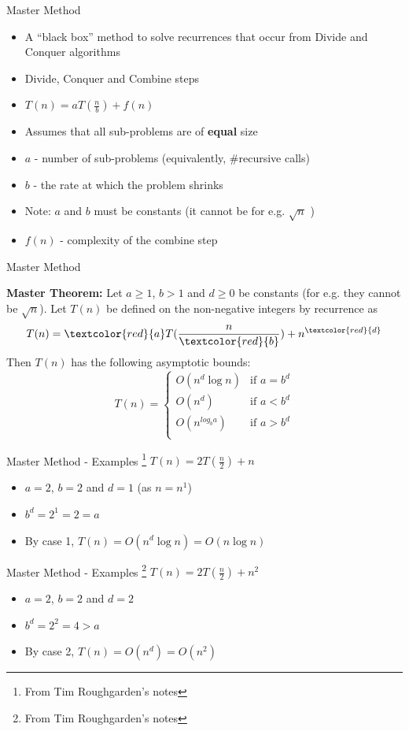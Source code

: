 \documentclass{beamer}
\newcommand{\hred}[1]{{\textcolor{red}{#1}}}
\begin{document}
\begin{frame}{Master Method}
\begin{itemize}
    \item A ``black box'' method to solve recurrences that occur from Divide and Conquer algorithms
    \item Divide, Conquer and Combine steps 
    \item $T(n) = aT(\frac{n}{b}) + f(n)$
    \item Assumes that all sub-problems are of {\bf equal} size
    \item $a$ - number of sub-problems (equivalently, \#recursive calls)
    \item $b$ - the rate at which the problem shrinks
    \item Note: $a$ and $b$ must be constants  (it cannot be for e.g. $\sqrt{n}$ )
    \item $f(n)$ - complexity of the combine step 
\end{itemize}
\end{frame}

\begin{frame}{Master Method}

{\bf Master Theorem:}  Let $a \geq 1$, $b > 1$ and $d \geq 0$ be constants (for e.g. they cannot be $\sqrt{n}$).
Let $T(n)$ be defined on the non-negative integers by recurrence as 
                    $$T(n) = \hred{a} T(\frac{n}{\hred{b}}) + n^{\hred{d}}$$
Then $T(n)$ has the following asymptotic bounds:
\[
 T(n) =
  \begin{cases}
   O(n^d \log n) & \text{if } a = b^d \\
   O(n^d) & \text{if } a < b^d \\
   O(n^{log_b a}) & \text{if } a > b^d \\
  \end{cases}
\]
\end{frame}


\begin{frame}{Master Method - Examples \footnote{From Tim Roughgarden's notes}}
$T(n) = 2T(\frac{n}{2}) + n$
\begin{itemize}
\item $a=2$, $b=2$ and $d=1$ (as $n = n^1$)
\item $b^d = 2^1 = 2 = a$ 
\item By case 1, $T(n) = O(n^d \log n) = O(n \log n)$
\end{itemize}
\end{frame}


\begin{frame}{Master Method - Examples \footnote{From Tim Roughgarden's notes}}
$T(n) = 2T(\frac{n}{2}) + n^2$
\begin{itemize}
\item $a=2$, $b=2$ and $d=2$ 
\item $b^d = 2^2 = 4 > a$ 
\item By case 2, $T(n) = O(n^d) = O(n^2)$
\end{itemize}
\end{frame}
\end{document}
